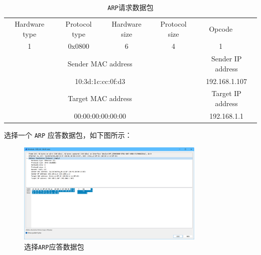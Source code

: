 \documentclass{article}
\begin{document}
\begin{enumerate}[noitemsep]
	\begin{table}[H]
		\centering
		\begin{tabularx}{0.78\textwidth}{|*{10}{X|}}
			\hline
			\multicolumn{2}{|c|}{Hardware type}      & \multicolumn{2}{c|}{Protocol type}     & \multicolumn{1}{c|}{Hardware size} & \multicolumn{1}{c|}{Protocol size} & \multicolumn{2}{c|}{Opcode} & \multicolumn{2}{c|}{} \\
			\multicolumn{2}{|c|}{1}                  & \multicolumn{2}{c|}{0x0800}            & \multicolumn{1}{c|}{6}             & \multicolumn{1}{c|}{4}             & \multicolumn{2}{c|}{1}      & \multicolumn{2}{c|}{} \\
			\hline
			\multicolumn{6}{|c|}{Sender MAC address} & \multicolumn{4}{c|}{Sender IP address}                                                                                                                                 \\
			\multicolumn{6}{|c|}{10:3d:1c:cc:0f:d3}  & \multicolumn{4}{c|}{192.168.1.107}                                                                                                                                     \\
			\hline
			\multicolumn{6}{|c|}{Target MAC address} & \multicolumn{4}{c|}{Target IP address}                                                                                                                                 \\
			\multicolumn{6}{|c|}{00:00:00:00:00:00}  & \multicolumn{4}{c|}{192.168.1.1}                                                                                                                                       \\
			\hline
		\end{tabularx}
		\caption{\texttt{ARP}请求数据包}
	\end{table}
	
	选择一个 \texttt{ARP} 应答数据包，如下图所示：
	
	\begin{figure}[H]
		\centering
		\includegraphics[width=0.8\textwidth]{img/7.png}
		\caption{选择\texttt{ARP}应答数据包}
		\label{fig:7}
	\end{figure}
	

\end{enumerate}
\end{document}
